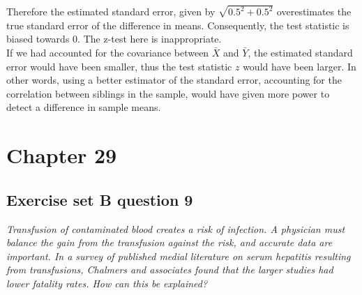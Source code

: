 \documentclass[11pt]{article}
\begin{document}
Therefore the estimated standard error, given by $\sqrt{0.5^2 + 0.5^2}$ overestimates the true standard error of the difference in means.  Consequently, the test statistic is biased towards $0$.  The z-test here is inappropriate. \\

If we had accounted for the covariance between $\bar{X}$ and $\bar{Y}$, the estimated standard error would have been smaller, thus the test statistic $z$ would have been larger.  In other words, using a better estimator of the standard error, accounting for the correlation between siblings in the sample, would have given more power to detect a difference in sample means.





\section*{Chapter 29}


\subsection*{Exercise set B question 9} %
\textit{Transfusion of contaminated blood creates a risk of infection. A physician must balance the gain from the transfusion against the risk, and accurate data are important. In a survey of published medial literature on serum hepatitis resulting from transfusions, Chalmers and associates found that the larger studies had lower fatality rates. How can this be explained?}\\
\end{document}
